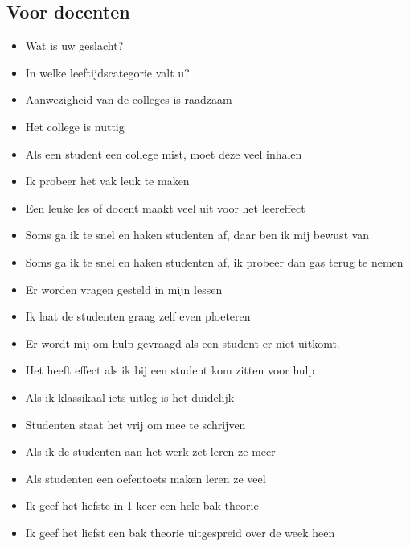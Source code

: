 \subsection{Voor docenten}
\begin{itemize}
  \item Wat is uw geslacht?
  \item In welke leeftijdscategorie valt u?
  \item Aanwezigheid van de colleges is raadzaam
  \item Het college is nuttig
  \item Als een student een college mist, moet deze veel inhalen
  \item Ik probeer het vak leuk te maken
  \item Een leuke les of docent maakt veel uit voor het leereffect
  \item Soms ga ik te snel en haken studenten af, daar ben ik mij bewust van
  \item Soms ga ik te snel en haken studenten af, ik probeer dan gas terug te nemen
  \item Er worden vragen gesteld in mijn lessen
  \item Ik laat de studenten graag zelf even ploeteren
  \item Er wordt mij om hulp gevraagd als een student er niet uitkomt.
  \item Het heeft effect als ik bij een student kom zitten voor hulp
  \item Als ik klassikaal iets uitleg is het duidelijk
  \item Studenten staat het vrij om mee te schrijven
  \item Als ik de studenten aan het werk zet leren ze meer
  \item Als studenten een oefentoets maken leren ze veel
  \item Ik geef het liefste in 1 keer een hele bak theorie
  \item Ik geef het liefst een bak theorie uitgespreid over de week heen
\end{itemize}